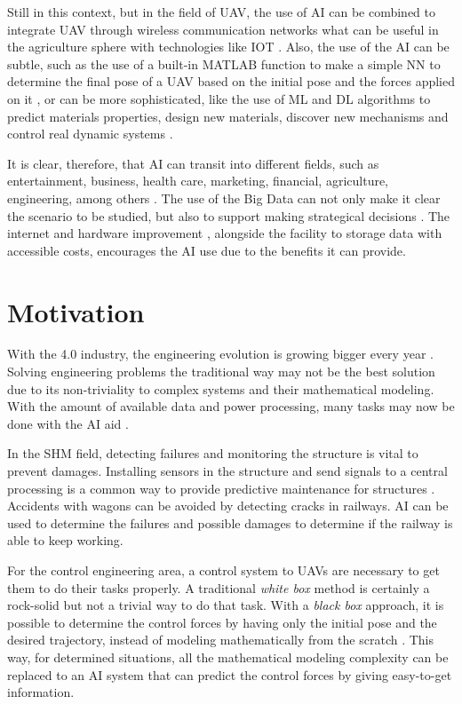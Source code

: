 Still in this context, but in the field of UAV, the use of AI can be combined to integrate UAV through wireless communication networks \cite{lahmeri2021} what can be useful in the agriculture sphere \cite{ahirwar2019} with technologies like IOT \cite{verdouw2016,tzounis2017}.
Also, the use of the AI can be subtle, such as the use of a built-in MATLAB function to make a simple NN to determine the final pose of a UAV based on the initial pose and the forces applied on it \cite{geronel2023}, or can be more sophisticated, like the use of ML and DL algorithms to predict materials properties, design new materials, discover new mechanisms and control real dynamic systems \cite{guo2021,assilian1974}.

It is clear, therefore, that AI can transit into different fields, such as entertainment, business, health care, marketing, financial, agriculture, engineering, among others \cite{ruiz-real2020,yu2018,davenport2019,verma2021,mhlanga2020,pannu2015,ghatrehsamani2023}. 
The use of the Big Data can not only make it clear the scenario to be studied, but also to support making strategical decisions \cite{jeble2018,koscielniak2015}.
The internet and hardware improvement \cite{baji2018}, alongside the facility to storage data with accessible costs, encourages the AI use due to the benefits it can provide.

\section{Motivation}

With the 4.0 industry, the engineering evolution is growing bigger every year \cite{meindl2021}.
Solving engineering problems the traditional way may not be the best solution due to its non-triviality to complex systems and their mathematical modeling.
With the amount of available data and power processing, many tasks may now be done with the AI aid \cite{pham1998}.

In the SHM field, detecting failures and monitoring the structure is vital to prevent damages. 
Installing sensors in the structure and send signals to a central processing is a common way to provide predictive maintenance for structures \cite{kahandawa2012,nagayama2007}.
Accidents with wagons can be avoided by detecting cracks in railways.
AI can be used to determine the failures and possible damages to determine if the railway is able to keep working.

For the control engineering area, a control system to UAVs are necessary to get them to do their tasks properly.
A traditional \emph{white box} method is certainly a rock-solid but not a trivial way to do that task. 
With a \emph{black box} approach, it is possible to determine the control forces by having only the initial pose and the desired trajectory, instead of modeling mathematically from the scratch \cite{loyola-gonzalez2019,wu2016}.
This way, for determined situations, all the mathematical modeling complexity can be replaced to an AI system that can predict the control forces by giving easy-to-get information.

